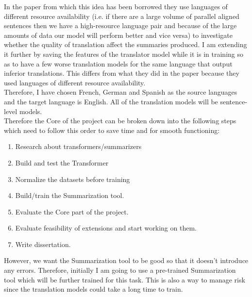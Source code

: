 \documentclass[12pt, a4paper]{article}
\begin{document}
In the paper from which this idea has been borrowed they use languages of different resource availability (i.e. if there are a large volume of parallel aligned sentences then we have a high-resource language pair and because of the large amounts of data our model will perform better and vice versa) to investigate whether the quality of translation affect the summaries produced. I am extending it further by saving the features of the translator model while it is in training so as to have a few worse translation models for the same language that output inferior translations. This differs from what they did in the paper because they used languages of different resource availability. %
\\
Therefore, I have chosen French, German and Spanish as the source languages and the target language is English. All of the translation models will be sentence-level models. 
\\
Therefore the Core of the project can be broken down into the following steps which need to follow this order to save time and for smooth functioning: 
\begin{enumerate}
  
  \item Research about transformers/summarizers
  \item Build and test the Transformer
  \item Normalize the datasets before training
  \item Build/train the Summarization tool.
  \item Evaluate the Core part of the project.
  \item Evaluate feasibility of extensions and start working on them.
  \item Write dissertation. 
  
\end{enumerate}
However, we want the Summarization tool to be good so that it doesn't introduce any errors. Therefore, initially I am going to use a pre-trained Summarization tool which will be further trained for this task. This is also a way to manage risk since the translation models could take a long time to train.
\end{document}
